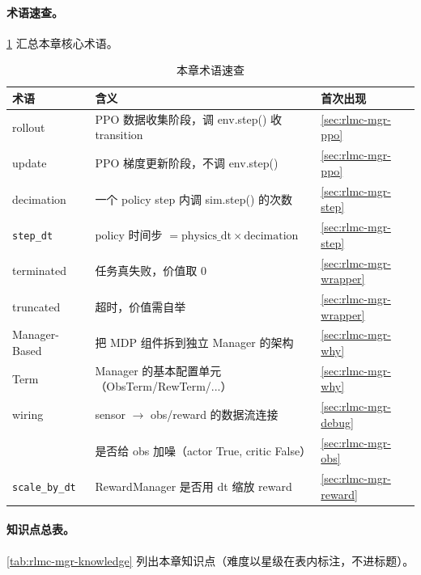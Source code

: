 \paragraph{术语速查。}\cref{tab:rlmc-mgr-glossary} 汇总本章核心术语。

\begin{table}[H]
\centering
\caption{本章术语速查}
\label{tab:rlmc-mgr-glossary}
\footnotesize
\begin{tabular}{@{}lll@{}}
\toprule
术语 & 含义 & 首次出现 \\
\midrule
rollout & PPO 数据收集阶段，调 env.step() 收 transition & \cref{sec:rlmc-mgr-ppo} \\
update & PPO 梯度更新阶段，不调 env.step() & \cref{sec:rlmc-mgr-ppo} \\
decimation & 一个 policy step 内调 sim.step() 的次数 & \cref{sec:rlmc-mgr-step} \\
\verb|step_dt| & policy 时间步 $=\text{physics\_dt}\times\text{decimation}$ & \cref{sec:rlmc-mgr-step} \\
terminated & 任务真失败，价值取 0 & \cref{sec:rlmc-mgr-wrapper} \\
truncated & 超时，价值需自举 & \cref{sec:rlmc-mgr-wrapper} \\
Manager-Based & 把 MDP 组件拆到独立 Manager 的架构 & \cref{sec:rlmc-mgr-why} \\
Term & Manager 的基本配置单元（ObsTerm/RewTerm/...） & \cref{sec:rlmc-mgr-why} \\
wiring & sensor $\to$ obs/reward 的数据流连接 & \cref{sec:rlmc-mgr-debug} \\
\Verb[breaklines]|enable_corruption| & 是否给 obs 加噪（actor True, critic False） & \cref{sec:rlmc-mgr-obs} \\
\verb|scale_by_dt| & RewardManager 是否用 dt 缩放 reward & \cref{sec:rlmc-mgr-reward} \\
\bottomrule
\end{tabular}
\end{table}

\paragraph{知识点总表。}\cref{tab:rlmc-mgr-knowledge} 列出本章知识点（难度以星级在表内标注，不进标题）。

